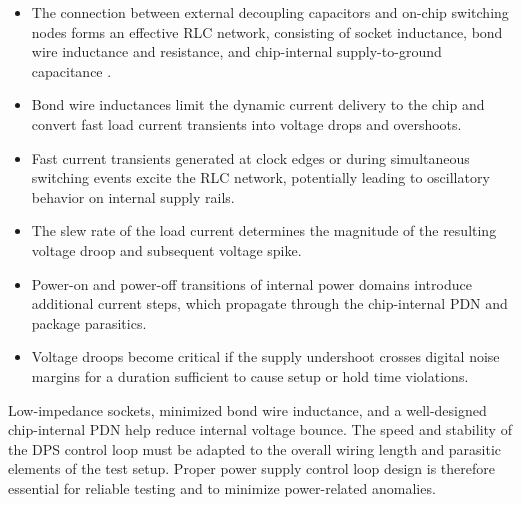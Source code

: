 \begin{itemize}[topsep=8pt,itemsep=4pt,partopsep=4pt, parsep=4pt]
    \item
    The connection between external decoupling capacitors and on-chip
    switching nodes forms an effective RLC network, consisting of socket
    inductance, bond wire inductance and resistance, and chip-internal
    supply-to-ground capacitance \autocite{8919754}.

    \item
    Bond wire inductances limit the dynamic current delivery to the chip
    and convert fast load current transients into voltage drops and
    overshoots.

    \item
    Fast current transients generated at clock edges or during
    simultaneous switching events excite the RLC network, potentially
    leading to oscillatory behavior on internal supply rails.

    \item
    The slew rate of the load current determines the magnitude of the
    resulting voltage droop and subsequent voltage spike.

    \item
    Power-on and power-off transitions of internal power domains introduce
    additional current steps, which propagate through the chip-internal
    \ac{PDN} and package parasitics.

    \item
    Voltage droops become critical if the supply undershoot crosses
    digital noise margins for a duration sufficient to cause setup or
    hold time violations.
\end{itemize}

Low-impedance sockets, minimized bond wire inductance, and a well-designed
chip-internal \ac{PDN} help reduce internal voltage bounce. The speed and
stability of the \ac{DPS} control loop must be adapted to the overall
wiring length and parasitic elements of the test setup. Proper power
supply control loop design is therefore essential for reliable testing
and to minimize power-related anomalies.